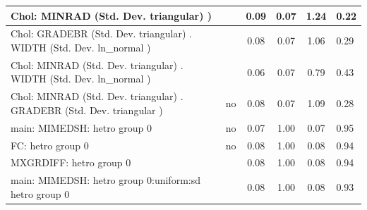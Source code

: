 \begin{table}
\begin{center}
\begin{tabular}{|l|l|c|c|c|l|}
			\hline
			 Chol: MINRAD (Std. Dev. triangular) ) &  & 0.09 & 0.07 & 1.24 & 0.22 \\
			\hline
			 Chol: GRADEBR (Std. Dev. triangular) . WIDTH (Std. Dev.   ln_normal ) &  & 0.08 & 0.07 & 1.06 & 0.29 \\
			\hline
			 Chol: MINRAD (Std. Dev. triangular) . WIDTH (Std. Dev.   ln_normal ) &  & 0.06 & 0.07 & 0.79 & 0.43 \\
			\hline
			 Chol: MINRAD (Std. Dev. triangular) . GRADEBR (Std. Dev.   triangular ) & no & 0.08 & 0.07 & 1.09 & 0.28 \\
			\hline
			main: MIMEDSH: hetro group 0 & no & 0.07 & 1.00 & 0.07 & 0.95 \\
			\hline
			FC: hetro group 0 & no & 0.08 & 1.00 & 0.08 & 0.94 \\
			\hline
			MXGRDIFF: hetro group 0 &  & 0.08 & 1.00 & 0.08 & 0.94 \\
			\hline
			main: MIMEDSH: hetro group 0:uniform:sd  hetro group 0 &  & 0.08 & 1.00 & 0.08 & 0.93 \\
			\hline
		\end{tabular}
	\end{center}
\end{table}